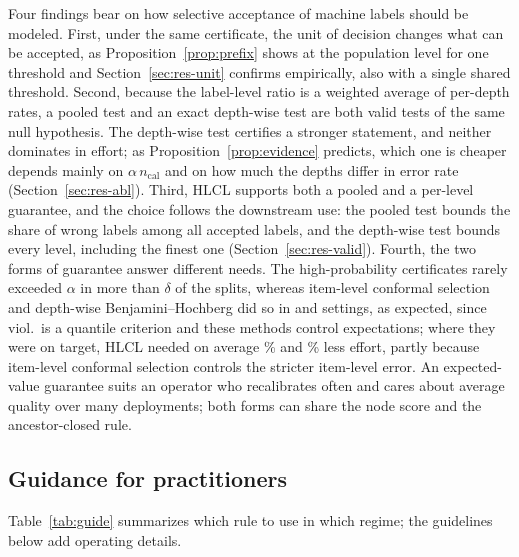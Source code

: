 \documentclass[preprint,12pt]{elsarticle}
\theoremstyle{definition}
\newcommand{\hlcl}{\textup{\textsc{HLCL}}}
\begin{document}
Four findings bear on how selective acceptance of machine labels should be
modeled. First, under the same certificate, the unit of decision changes what
can be accepted, as Proposition~\ref{prop:prefix} shows at the population level
for one threshold and Section~\ref{sec:res-unit} confirms empirically, also with
a single shared threshold. Second, because the label-level ratio is a weighted
average of per-depth rates, a pooled test and an exact depth-wise test are both
valid tests of the same null hypothesis. The depth-wise test certifies a
stronger statement, and neither dominates in effort; as
Proposition~\ref{prop:evidence} predicts, which one is cheaper depends mainly on
$\alpha\,n_{\mathrm{cal}}$ and on how much the depths differ in error rate
(Section~\ref{sec:res-abl}). Third, \hlcl{} supports both a pooled and a
per-level guarantee, and the choice follows the downstream use: the pooled test
bounds the share of wrong labels among all accepted labels, and the depth-wise
test bounds every level, including the finest one
(Section~\ref{sec:res-valid}). Fourth, the two forms of guarantee
answer different needs. The high-probability certificates rarely exceeded
$\alpha$ in more than $\delta$ of the splits, whereas item-level conformal
selection and depth-wise Benjamini--Hochberg did so in 
and  settings, as expected, since viol.\ is a quantile
criterion and these methods control expectations; where they were on target,
\hlcl{} needed on average \% and \% less
effort, partly because item-level conformal selection controls the stricter
item-level error. An expected-value guarantee suits an operator who
recalibrates often and cares about average quality over many deployments; both
forms can share the node score and the ancestor-closed rule.

\subsection{Guidance for practitioners}
\label{sec:disc-guidelines}


Table~\ref{tab:guide} summarizes which rule to use in which regime; the
guidelines below add operating details.
\end{document}
